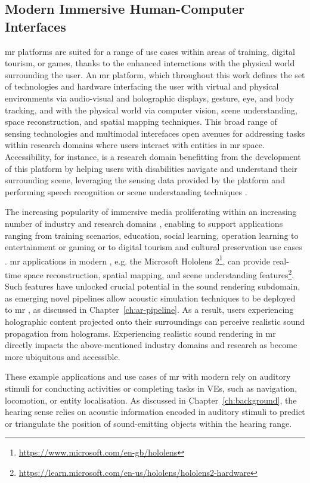 \subsection{Modern Immersive Human-Computer Interfaces}
\acrshort{mr} platforms are suited for a range of use cases within areas of training, digital tourism, or games, thanks to the enhanced interactions with the physical world surrounding the user. An \acrshort{mr} platform, which throughout this work defines the set of technologies and hardware interfacing the user with virtual and physical environments via audio-visual and holographic displays, gesture, eye, and body tracking, and with the physical world via computer vision, scene understanding, space reconstruction, and spatial mapping techniques. This broad range of sensing technologies and multimodal interefaces open avenues for addressing tasks within research domains where users interact with entities in \acrshort{mr} space. Accessibility, for instance, is a research domain benefitting from the development of this platform by helping users with disabilities navigate and understand their surrounding scene, leveraging the sensing data provided by the platform and performing speech recognition or scene understanding techniques \citep{mehra2020potential}.\par
The increasing popularity of immersive media proliferating within an increasing number of industry and research domains \citep{park2022metaverse}, enabling  to support applications ranging from training scenarios, education, social learning, operation learning \citep{harris2020effect, ahir2020application} to entertainment or gaming \citep{yuen2011augmented, ke2018virtual} or to digital tourism and cultural preservation use cases \citep{schofield2018viking, selmanovic2020cultural}. \acrshort{mr} applications in modern , e.g. the Microsoft Hololens 2\footnote{\url{https://www.microsoft.com/en-gb/hololens}\label{note:ms-hl2}}, can provide real-time space reconstruction, spatial mapping, and scene understanding features\footnote{\url{https://learn.microsoft.com/en-us/hololens/hololens2-hardware}\label{note:ms-hl2-hw}}. Such features have unlocked crucial potential in the sound rendering subdomain, as emerging novel pipelines allow acoustic simulation techniques to be deployed to \acrshort{mr} , as discussed in Chapter~\ref{ch:ar-pipeline}. As a result, users experiencing holographic content projected onto their surroundings can perceive realistic sound propagation from holograms. Experiencing realistic sound rendering in \acrshort{mr} directly impacts the above-mentioned industry domains and research as  become more ubiquitous and accessible.\par
These example applications and use cases of \acrshort{mr} with modern  rely on auditory stimuli for conducting activities or completing tasks in VEs, such as navigation, locomotion, or entity localisation. As discussed in Chapter~\ref{ch:background}, the hearing sense relies on acoustic information encoded in auditory stimuli to predict or triangulate the position of sound-emitting objects within the hearing range.

